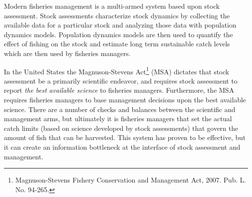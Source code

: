 \documentclass[12pt]{ucscthesis}
\begin{document}
%
Modern fisheries management is a multi-armed system based upon stock assessment. 
Stock assessments characterize stock dynamics by collecting the available 
data for a particular stock and analyzing those data with population dynamics 
models. Population dynamics models are then used to quantify the effect of 
fishing on the stock and estimate long term sustainable catch levels which are 
then used by fisheries managers. 

In the United States the Magnuson-Stevens Act\footnote{Magnuson-Stevens Fishery Conservation and Management Act, 2007. Pub. L. No. 94-265.} (MSA)
dictates that stock assessment be a primarily scientific endeavor, and requires 
stock assessment to report \textit{the best available science} 
to fisheries managers. Furthermore, the MSA requires fisheries managers %
to base management decisions upon the best available science. 
There are a number of checks and balances between the scientific and management 
arms, but ultimately it is fisheries managers that set the actual catch limits 
(based on science developed by stock assessments) that govern the amount of fish 
that can be harvested. This system has proven to be effective, but it can %
create an information bottleneck at the interface of stock assessment and 
management. 





\end{document}
